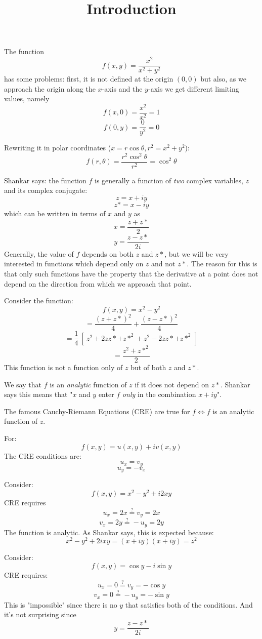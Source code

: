 \documentclass[11pt, oneside]{article}
\title{Introduction}
\date{}
\begin{document}
\maketitle
\Large

The function
\[ f(x,y) = \frac{x^2}{x^2 + y^2} \]
has some problems:  first, it is not defined at the origin $(0,0)$ but also, as we approach the origin along the $x$-axis and the $y$-axis we get different limiting values, namely
\[ f(x,0) = \frac{x^2}{x^2} = 1 \]
\[ f(0,y) = \frac{0}{y^2} = 0 \]

Rewriting it in polar coordinates ($x = r \cos \theta, r^2 = x^2 + y^2$):
\[ f(r,\theta) = \frac{r^2 \cos^2 \theta}{r^2} = \cos^2 \theta \]

Shankar says:  the function $f$ is generally a function of \emph{two} complex variables, $z$ and its complex conjugate:
\[ z = x + iy \]
\[ z* = x - iy \]
which can be written in terms of $x$ and $y$ as
\[ x = \frac{z + z*}{2} \]
\[ y = \frac{z - z*}{2i} \]
Generally, the value of $f$ depends on both $z$ and $z*$, but we will be very interested in functions which depend only on $z$ and not $z*$.  The reason for this is that only such functions have the property that the derivative at a point does not depend on the direction from which we approach that point.

Consider the function:
\[ f(x,y) = x^2 - y^2 \]
\[ = \frac{(z+z*)^2}{4} + \frac{(z-z*)^2}{4} \]
\[ = \frac{1}{4} \ [ \ z^2 + 2zz* + z*^2 + z^2 - 2zz* + z*^2 \ ] \]
\[ = \frac{z^2 + z*^2}{2} \]
This function is not a function only of $z$ but of both $z$ and $z*$.

We say that $f$ is an \emph{analytic} function of $z$ if it does not depend on $z*$.  Shankar says this means that "$x$ and $y$ enter $f$ \emph{only} in the combination $x + iy$".

The famous Cauchy-Riemann Equations (CRE) are true for $f \iff f$ is an analytic function of $z$.  

For:
\[ f(x,y) = u(x,y) + iv(x,y) \]
The CRE conditions are:
\[ u_x = v_y \]
\[ u_y = -v_x \]

Consider:
\[ f(x,y) = x^2 - y^2 + i2xy \]
CRE requires
\[ u_x = 2x \stackrel{?}{=}  v_y = 2x \]
\[ v_x = 2y \stackrel{?}{=} - u_y = 2y \]
The function is analytic.  As Shankar says, this is expected because:
\[ x^2 - y^2 + 2ixy = (x + iy)(x + iy) = z^2 \]

Consider:
\[ f(x,y) = \cos y - i \sin y \]
CRE requires:
\[ u_x = 0 \stackrel{?}{=} v_y = - \cos y \]
\[ v_x = 0 \stackrel{?}{=}  -u_y = - \sin y \]
This is "impossible" since there is no $y$ that satisfies both of the conditions.  And it's not surprising since
\[ y = \frac{z - z*}{2i} \]
\end{document}
